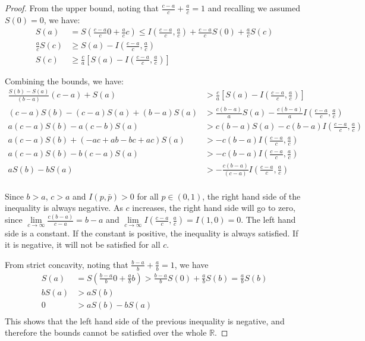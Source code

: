 \begin{mathSection}
\begin{proof}
	From the upper bound, noting that $\frac{c-a}{c} + \frac{a}{c} = 1$ and recalling we assumed $S(0) = 0$, we have:
	\begin{equation}
		\begin{aligned}
			S(a) &= S\left(\frac{c-a}{c} 0 + \frac{a}{c} c\right) \leq I\left(\frac{c-a}{c}, \frac{a}{c}\right) + \frac{c-a}{c} S(0) +\frac{a}{c} S(c) \\
			\frac{a}{c} S(c) &\geq S(a) - I\left(\frac{c-a}{c}, \frac{a}{c}\right) \\
			S(c) &\geq \frac{c}{a} \left[ S(a) - I\left(\frac{c-a}{c}, \frac{a}{c}\right) \right]
		\end{aligned}
	\end{equation}
	
	Combining the bounds, we have:
	\begin{equation}
		\begin{aligned}
			\frac{S(b) - S(a)}{(b-a)} (c-a) + S(a) &> \frac{c}{a} \left[ S(a) - I\left(\frac{c-a}{c}, \frac{a}{c}\right) \right] \\
			(c-a) S(b) - (c-a)S(a) + (b-a) S(a) &> \frac{c(b-a)}{a} S(a) - \frac{c(b-a)}{a} I\left(\frac{c-a}{c}, \frac{a}{c}\right) \\
			a (c-a) S(b) - a(c-b) S(a) &> c(b-a)S(a) - c(b-a) I\left(\frac{c-a}{c}, \frac{a}{c}\right) \\
			a (c-a) S(b) + (-ac +ab -bc +ac) S(a) &> - c(b-a) I\left(\frac{c-a}{c}, \frac{a}{c}\right) \\
			a (c-a) S(b) -b (c-a) S(a) &> - c(b-a) I\left(\frac{c-a}{c}, \frac{a}{c}\right) \\
			a  S(b) - b S(a) &> - \frac{c(b-a)}{(c-a)} I\left(\frac{c-a}{c}, \frac{a}{c}\right) \\
		\end{aligned}
	\end{equation}
	
	Since $b > a$, $c > a$ and $I(p,\bar{p}) > 0$ for all $p \in (0,1)$, the right hand side of the inequality is always negative. As $c$ increases, the right hand side will go to zero, since $\lim\limits_{c\to \infty}\frac{c(b-a)}{c-a} = b-a$ and $\lim\limits_{c\to \infty} I\left(\frac{c-a}{c}, \frac{a}{c}\right) = I(1,0) = 0$. The left hand side is a constant. If the constant is positive, the inequality is always satisfied. If it is negative, it will not be satisfied for all $c$.
	
	From strict concavity, noting that $\frac{b-a}{b} + \frac{a}{b} = 1$, we have
	\begin{equation}
		\begin{aligned}
			S(a) &= S\left(\frac{b-a}{b} 0 + \frac{a}{b} b\right) > \frac{b-a}{b} S(0) + \frac{a}{b} S(b) = \frac{a}{b} S(b)\\
			b S(a) &> a S(b)  \\
			0 &> a S(b) - b S(a)\\
		\end{aligned}
	\end{equation}
	This shows that the left hand side of the previous inequality is negative, and therefore the bounds cannot be satisfied over the whole $\mathbb{R}$.
	

\end{proof}
\end{mathSection}
